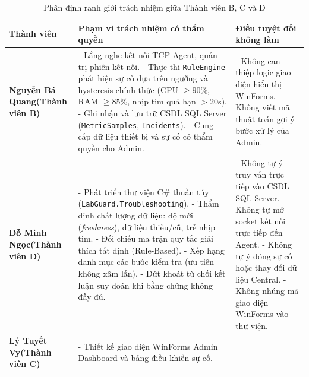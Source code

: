 \documentclass[12pt,a4paper]{article}
\begin{document}
\begin{table}[H]
  \centering
  \caption{Phân định ranh giới trách nhiệm giữa Thành viên B, C và D}
  \label{tab:tam-giac-trach-nhiem}
  \small
  \begin{tabularx}{\textwidth}{|p{}|X|p{}|}
    \hline
    \rowcolor{lgDeepBlue}
    \color{white}\textbf{Thành viên} & \color{white}\textbf{Phạm vi trách nhiệm có thẩm quyền} & \color{white}\textbf{Điều tuyệt đối không làm} \\
    \hline
    \textbf{Nguyễn Bá Quang\newline(Thành viên B)} &
    - Lắng nghe kết nối TCP Agent, quản trị phiên kết nối.\newline
    - Thực thi \texttt{RuleEngine} phát hiện sự cố dựa trên ngưỡng và hysteresis chính thức (CPU $\ge 90\%$, RAM $\ge 85\%$, nhịp tim quá hạn $> 20$s).\newline
    - Ghi nhận và lưu trữ CSDL SQL Server (\texttt{MetricSamples}, \texttt{Incidents}).\newline
    - Cung cấp dữ liệu thiết bị và sự cố có thẩm quyền cho Admin. &
    - Không can thiệp logic giao diện hiển thị WinForms.\newline
    - Không viết mã thuật toán gợi ý bước xử lý của Admin. \\
    \hline
    \textbf{Đỗ Minh Ngọc\newline(Thành viên D)} &
    - Phát triển thư viện C\# thuần túy (\texttt{LabGuard.Troubleshooting}).\newline
    - Thẩm định chất lượng dữ liệu: độ mới (\textit{freshness}), dữ liệu thiếu/cũ, trễ nhịp tim.\newline
    - Đối chiếu ma trận quy tắc giải thích tất định (Rule-Based).\newline
    - Xếp hạng danh mục các bước kiểm tra (ưu tiên không xâm lấn).\newline
    - Dứt khoát từ chối kết luận suy đoán khi bằng chứng không đầy đủ. &
    - Không tự ý truy vấn trực tiếp vào CSDL SQL Server.\newline
    - Không tự mở socket kết nối trực tiếp đến Agent.\newline
    - Không tự ý đóng sự cố hoặc thay đổi dữ liệu Central.\newline
    - Không nhúng mã giao diện WinForms vào thư viện. \\
    \hline
    \textbf{Lý Tuyết Vy\newline(Thành viên C)} &
    - Thiết kế giao diện WinForms Admin Dashboard và bảng điều khiển sự cố.\newline

\end{tabularx}
\end{table}
\end{document}
